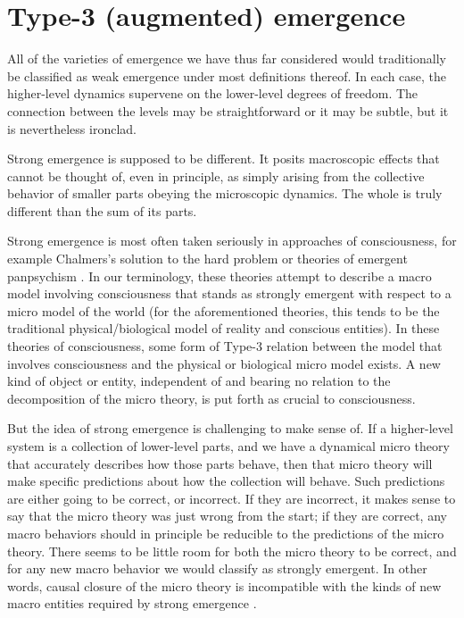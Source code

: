 \documentclass[12pt,english]{article}
\newcommand{\autocite}{\cite}
\begin{document}
\section*{Type-3 (augmented) emergence}

All of the varieties of emergence we have thus far considered would traditionally be classified as weak emergence under most definitions thereof.
In each case, the higher-level dynamics supervene on the lower-level degrees of freedom.
The connection between the levels may be straightforward or it may be subtle, but it is nevertheless ironclad.

Strong emergence is supposed to be different.
It posits macroscopic effects that cannot be thought of, even in principle, as simply arising from the collective behavior of smaller parts obeying the microscopic dynamics.
The whole is truly different than the sum of its parts.

Strong emergence is most often taken seriously in approaches of consciousness, for example Chalmers's solution to the hard problem or theories of emergent panpsychism \autocite{Chalmers2007, sep-panpsychism}.  
In our terminology, these theories attempt to describe a macro model involving consciousness that stands as strongly emergent with respect to a micro model of the world (for the aforementioned theories, this tends to be the traditional physical/biological model of reality and conscious entities). 
In these theories of consciousness, some form of Type-3 relation between the model that involves consciousness and the physical or biological micro model exists. 
A new kind of object or entity, independent of and bearing no relation to the decomposition of the micro theory, is put forth as crucial to consciousness. 

But the idea of strong emergence is challenging to make sense of.
If a higher-level system is a collection of lower-level parts, and we have a dynamical micro theory that accurately describes how those parts behave, then that micro theory will make specific predictions about how the collection will behave.
Such predictions are either going to be correct, or incorrect.
If they are incorrect, it makes sense to say that the micro theory was just wrong from the start; if they are correct, any macro behaviors should in principle be reducible to the predictions of the micro theory.
There seems to be little room for both the micro theory to be correct, and for any new macro behavior we would classify as strongly emergent.
In other words, causal closure of the micro theory is incompatible with the kinds of new macro entities required by strong emergence \autocite{Kim2006-KIMECI}.
\end{document}
